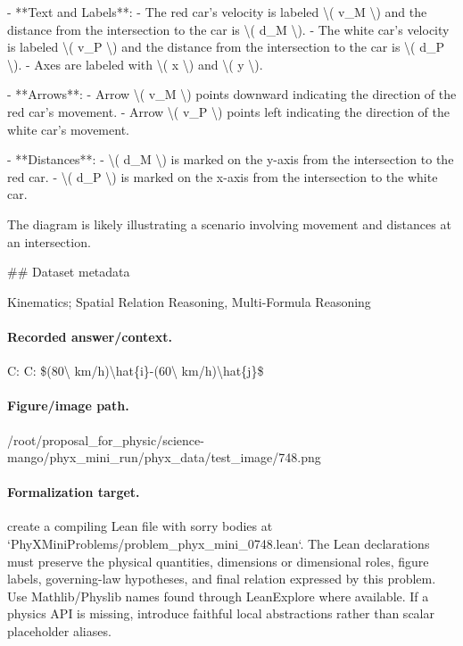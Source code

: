 - **Text and Labels**: 
  - The red car's velocity is labeled \textbackslash{}( v\_M \textbackslash{}) and the distance from the intersection to the car is \textbackslash{}( d\_M \textbackslash{}).
  - The white car's velocity is labeled \textbackslash{}( v\_P \textbackslash{}) and the distance from the intersection to the car is \textbackslash{}( d\_P \textbackslash{}).
  - Axes are labeled with \textbackslash{}( x \textbackslash{}) and \textbackslash{}( y \textbackslash{}).

- **Arrows**: 
  - Arrow \textbackslash{}( v\_M \textbackslash{}) points downward indicating the direction of the red car's movement.
  - Arrow \textbackslash{}( v\_P \textbackslash{}) points left indicating the direction of the white car's movement.

- **Distances**: 
  - \textbackslash{}( d\_M \textbackslash{}) is marked on the y-axis from the intersection to the red car.
  - \textbackslash{}( d\_P \textbackslash{}) is marked on the x-axis from the intersection to the white car.

The diagram is likely illustrating a scenario involving movement and distances at an intersection.

\#\# Dataset metadata

Kinematics; Spatial Relation Reasoning, Multi-Formula Reasoning

\paragraph{Recorded answer/context.}
C: C: \$(80\textbackslash{} km/h)\textbackslash{}hat\{i\}-(60\textbackslash{} km/h)\textbackslash{}hat\{j\}\$

\paragraph{Figure/image path.}
/root/proposal\_for\_physic/science-mango/phyx\_mini\_run/phyx\_data/test\_image/748.png

\paragraph{Formalization target.}
create a compiling Lean file with sorry bodies at `PhyXMiniProblems/problem\_phyx\_mini\_0748.lean`. The Lean declarations must preserve the physical quantities, dimensions or dimensional roles, figure labels, governing-law hypotheses, and final relation expressed by this problem.
Use Mathlib/Physlib names found through LeanExplore where available. If a physics API is missing, introduce faithful local abstractions rather than scalar placeholder aliases.

